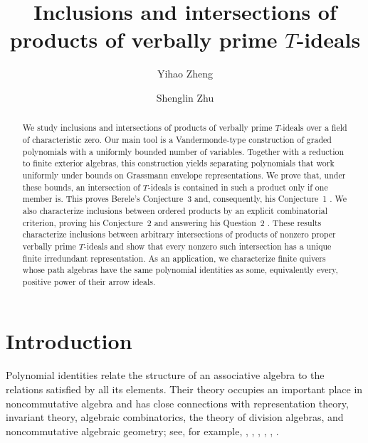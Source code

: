 \documentclass[11pt,reqno]{amsart}
\title[Products and intersections of verbally prime $T$-ideals]{Inclusions and intersections of products
of verbally prime $T$-ideals}
\author{Yihao Zheng}
\author{Shenglin Zhu}
\date{}
\theoremstyle{definition}
\theoremstyle{remark}
\numberwithin{equation}{section}
\begin{document}
\begin{abstract}
We study inclusions and intersections of products of verbally prime
$T$-ideals over a field of characteristic zero.  Our main tool is a Vandermonde-type construction of graded
polynomials with a uniformly bounded number of variables.
Together with a reduction to finite exterior algebras,
this construction yields separating polynomials that work
uniformly under bounds on Grassmann envelope representations.
We prove that, under these bounds, an intersection of
$T$-ideals is contained in such a product only if one member is.
This proves Berele's
Conjecture~3 and, consequently, his Conjecture~1 \cite{Berele2012}. We also characterize inclusions between ordered products
by an explicit combinatorial criterion, proving his Conjecture~2 and answering
his Question~2 \cite{Berele2012}.
These results characterize inclusions between arbitrary
intersections of products of nonzero proper verbally
prime $T$-ideals and show that every nonzero such
intersection has a unique finite irredundant representation.
As an application, we characterize finite quivers whose
path algebras have the same polynomial identities as some,
equivalently every, positive power of their arrow ideals.





\end{abstract}
\maketitle

\section{Introduction}\label{sec:introduction}

Polynomial identities relate the structure of an associative
algebra to the relations satisfied by all its elements.
Their theory occupies an important place in noncommutative
algebra and has close connections with representation theory,
invariant theory, algebraic combinatorics, the theory of
division algebras, and noncommutative algebraic geometry;
see, for example,   
\cite{Bresar2014},  \cite{DrenskyFormanek2004},  \cite{Formanek1991},   
\cite{GiambrunoZaicev2005},  \cite{Jacobson1975},  \cite{ReichsteinVonessen2007}.


\end{document}
